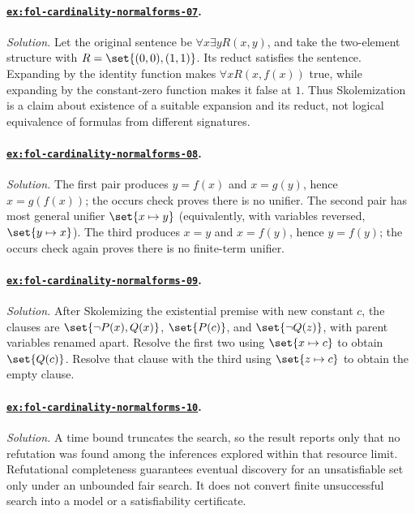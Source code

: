 \paragraph{\hyperref[ex:fol-cardinality-normalforms-07]{\texttt{ex:fol-cardinality-normalforms-07}}.}
\textit{Solution.}  Let the original sentence be
\(\forall x\exists yR(x,y)\), and take the two-element structure with
\(R=\set{(0,0),(1,1)}\).  Its reduct satisfies the sentence.  Expanding by the
identity function makes \(\forall xR(x,f(x))\) true, while expanding by the
constant-zero function makes it false at \(1\).  Thus Skolemization is a claim
about existence of a suitable expansion and its reduct, not logical
equivalence of formulas from different signatures.

\paragraph{\hyperref[ex:fol-cardinality-normalforms-08]{\texttt{ex:fol-cardinality-normalforms-08}}.}
\textit{Solution.}  The first pair produces \(y=f(x)\) and
\(x=g(y)\), hence \(x=g(f(x))\); the occurs check proves there is no unifier.
The second pair has most general unifier \(\set{x\mapsto y}\) (equivalently,
with variables reversed, \(\set{y\mapsto x}\)).  The third produces
\(x=y\) and \(x=f(y)\), hence \(y=f(y)\); the occurs check again proves there
is no finite-term unifier.

\paragraph{\hyperref[ex:fol-cardinality-normalforms-09]{\texttt{ex:fol-cardinality-normalforms-09}}.}
\textit{Solution.}  After Skolemizing the existential premise with new constant
\(c\), the clauses are
\(\set{\neg P(x),Q(x)}\), \(\set{P(c)}\), and
\(\set{\neg Q(z)}\), with parent variables renamed apart.  Resolve the first
two using \(\set{x\mapsto c}\) to obtain \(\set{Q(c)}\).  Resolve that clause
with the third using \(\set{z\mapsto c}\) to obtain the empty clause.

\paragraph{\hyperref[ex:fol-cardinality-normalforms-10]{\texttt{ex:fol-cardinality-normalforms-10}}.}
\textit{Solution.}  A time bound truncates the search, so the result reports
only that no refutation was found among the inferences explored within that
resource limit.  Refutational completeness guarantees eventual discovery for
an unsatisfiable set only under an unbounded fair search.  It does not convert
finite unsuccessful search into a model or a satisfiability certificate.

